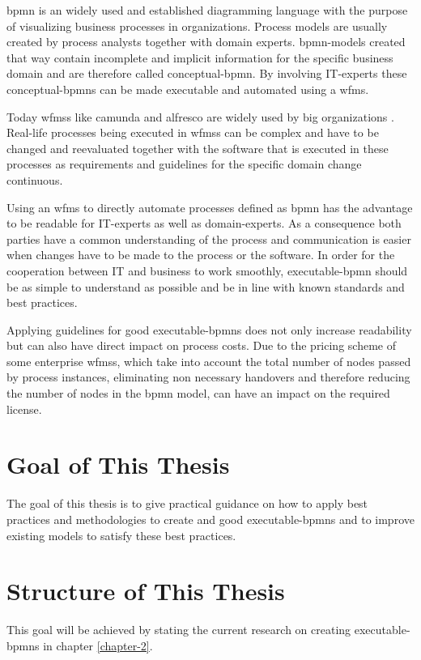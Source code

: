 \gls{bpmn} is an widely used and established diagramming language with the purpose of visualizing business processes in organizations. Process models are usually created by process analysts together with domain experts. \gls{bpmn}-models created that way contain incomplete and implicit information for the specific business domain and are therefore called \gls{conceptual-bpmn}. By involving IT-experts these \gls{conceptual-bpmn}s can be made executable and automated using a \gls{wfms}. \cite{fundamentals}

Today \gls{wfms}s like \gls{camunda}  and \gls{alfresco} are widely used by big organizations \cite{camunda-customers} \cite{activity-customers}. Real-life processes being executed in \gls{wfms}s can be complex and have to be changed and reevaluated together with the software that is executed in these processes as requirements and guidelines for the specific domain change continuous. 

Using an \gls{wfms} to directly automate processes defined as \gls{bpmn} has the advantage to be readable for IT-experts as well as domain-experts. As a consequence both parties have a common understanding of the process and communication is easier when changes have to be made to the process or the software. In order for the cooperation between IT and business to work smoothly, \gls{executable-bpmn} should be as simple to understand as possible and be in line with known standards and best practices. 

Applying guidelines for good \gls{executable-bpmn}s does not only increase readability but can also have direct impact on process costs. Due to the pricing scheme of some enterprise \gls{wfms}s, which take into account the total number of nodes passed by process instances, eliminating non necessary handovers and therefore reducing the number of nodes in the \gls{bpmn} model, can have an impact on the required license. 

\section{Goal of This Thesis}
The goal of this thesis is to give practical guidance on how to apply best practices and methodologies to create and good \gls{executable-bpmn}s and to improve existing models to satisfy these best practices. 


\section{Structure of This Thesis}
This goal will be achieved by stating the current research on creating \gls{executable-bpmn}s in chapter \ref{chapter-2}. 

